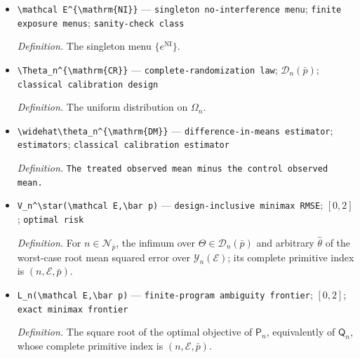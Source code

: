 \documentclass{article}
\begin{document}
\begin{itemize}
  \par\smallskip\noindent\emph{Definition.} The coordinate mapping \(e^{\mathrm{NI}}_{i,n}(z)=z_i\).
  \item \texttt{\textbackslash{}\allowbreak{}mathcal E\textasciicircum{}\{\textbackslash{}\allowbreak{}mathrm\{NI\}\allowbreak{}\}\allowbreak{}} --- \texttt{singleton no-\allowbreak{}interference menu}; \texttt{finite exposure menus}; \texttt{sanity-\allowbreak{}check class}
  \par\smallskip\noindent\emph{Definition.} The singleton menu \(\{e^{\mathrm{NI}}\}\).
  \item \texttt{\textbackslash{}\allowbreak{}Theta\_\allowbreak{}n\textasciicircum{}\{\textbackslash{}\allowbreak{}mathrm\{CR\}\allowbreak{}\}\allowbreak{}} --- \texttt{complete-\allowbreak{}randomization law}; \(\mathcal D_n(\bar p)\); \texttt{classical calibration design}
  \par\smallskip\noindent\emph{Definition.} The uniform distribution on \(\Omega_n\).
  \item \texttt{\textbackslash{}\allowbreak{}widehat\textbackslash{}\allowbreak{}theta\_\allowbreak{}n\textasciicircum{}\{\textbackslash{}\allowbreak{}mathrm\{DM\}\allowbreak{}\}\allowbreak{}} --- \texttt{difference-\allowbreak{}in-\allowbreak{}means estimator}; \texttt{estimators}; \texttt{classical calibration estimator}
  \par\smallskip\noindent\emph{Definition.} \texttt{The treated observed mean minus the control observed mean.}
  \item \texttt{V\_\allowbreak{}n\textasciicircum{}\textbackslash{}\allowbreak{}star(\textbackslash{}\allowbreak{}mathcal E,\allowbreak{}\textbackslash{}\allowbreak{}bar p)} --- \texttt{design-\allowbreak{}inclusive minimax RMSE}; \([0,2]\); \texttt{optimal risk}
  \par\smallskip\noindent\emph{Definition.} For \(n\in\mathcal N_{\bar p}\), the infimum over \(\Theta\in\mathcal D_n(\bar p)\) and arbitrary \(\widehat\theta\) of the worst-case root mean squared error over \(\mathcal Y_n(\mathcal E)\); its complete primitive index is \((n,\mathcal E,\bar p)\).
  \item \texttt{L\_\allowbreak{}n(\textbackslash{}\allowbreak{}mathcal E,\allowbreak{}\textbackslash{}\allowbreak{}bar p)} --- \texttt{finite-\allowbreak{}program ambiguity frontier}; \([0,2]\); \texttt{exact minimax frontier}
  \par\smallskip\noindent\emph{Definition.} The square root of the optimal objective of \(\mathsf P_n\), equivalently of \(\mathsf Q_n\), whose complete primitive index is \((n,\mathcal E,\bar p)\).
\end{itemize}
\end{document}
